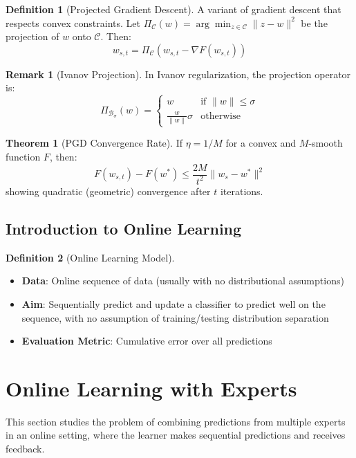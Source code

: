 \documentclass[12pt,a4paper]{article}
\theoremstyle{definition}
\newtheorem{definition}{Definition}[section]
\newtheorem{theorem}{Theorem}[section]
\newtheorem{remark}{Remark}[section]
\begin{document}
\begin{definition}[Projected Gradient Descent]
A variant of gradient descent that respects convex constraints. Let $\Pi_\mathcal{C}(w) = \arg\min_{z \in \mathcal{C}} \|z - w\|^2$ be the projection of $w$ onto $\mathcal{C}$. Then:
\[
w_{s,t} = \Pi_\mathcal{C}(w_{s,t} - \nabla F(w_{s,t}))
\]
\end{definition}

\begin{remark}[Ivanov Projection]
In Ivanov regularization, the projection operator is:
\[
\Pi_{\mathcal{B}_\sigma}(w) = \begin{cases}
w & \text{if } \|w\| \leq \sigma \\
\frac{w}{\|w\|} \sigma & \text{otherwise}
\end{cases}
\]
\end{remark}

\begin{theorem}[PGD Convergence Rate]
If $\eta = 1/M$ for a convex and $M$-smooth function $F$, then:
\[
F(w_{s,t}) - F(w^*) \leq \frac{2M}{t^2} \|w_s - w^*\|^2
\]
showing quadratic (geometric) convergence after $t$ iterations.
\end{theorem}

\subsection{Introduction to Online Learning}

\begin{definition}[Online Learning Model]
\begin{itemize}
    \item \textbf{Data}: Online sequence of data (usually with no distributional assumptions)
    \item \textbf{Aim}: Sequentially predict and update a classifier to predict well on the sequence, with no assumption of training/testing distribution separation
    \item \textbf{Evaluation Metric}: Cumulative error over all predictions
\end{itemize}
\end{definition}

\newpage


\section{Online Learning with Experts}

This section studies the problem of combining predictions from multiple experts in an online setting, where the learner makes sequential predictions and receives feedback.
\end{document}
